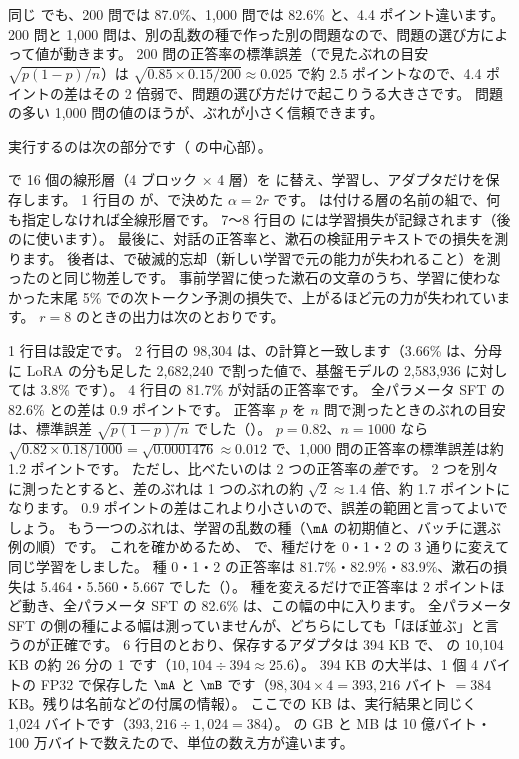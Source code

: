 同じ  でも、200 問では 87.0\%、1,000 問では 82.6\% と、4.4 ポイント違います。
200 問と 1,000 問は、別の乱数の種で作った別の問題なので、問題の選び方によって値が動きます。
200 問の正答率の標準誤差（で見たぶれの目安 $\sqrt{p(1-p)/n}$）は $\sqrt{0.85\times0.15/200}\approx0.025$ で約 2.5 ポイントなので、4.4 ポイントの差はその 2 倍弱で、問題の選び方だけで起こりうる大きさです。
問題の多い 1,000 問の値のほうが、ぶれが小さく信頼できます。

実行するのは次の部分です（ の中心部）。


 で 16 個の線形層（4 ブロック × 4 層）を  に替え、学習し、アダプタだけを保存します。
1 行目の  が、で決めた $\alpha=2r$ です。
 は付ける層の名前の組で、何も指定しなければ全線形層です。
7〜8 行目の  には学習損失が記録されます（後のに使います）。
最後に、対話の正答率と、漱石の検証用テキストでの損失を測ります。
後者は、で破滅的忘却（新しい学習で元の能力が失われること）を測ったのと同じ物差しです。
事前学習に使った漱石の文章のうち、学習に使わなかった末尾 5\% での次トークン予測の損失で、上がるほど元の力が失われています。
$r=8$ のときの出力は次のとおりです。


1 行目は設定です。
2 行目の 98,304 は、の計算と一致します（3.66\% は、分母に LoRA の分も足した 2,682,240 で割った値で、基盤モデルの 2,583,936 に対しては 3.8\% です）。
4 行目の 81.7\% が対話の正答率です。
全パラメータ SFT の 82.6\% との差は 0.9 ポイントです。
正答率 $p$ を $n$ 問で測ったときのぶれの目安は、標準誤差 $\sqrt{p(1-p)/n}$ でした（）。
$p=0.82$、$n=1000$ なら $\sqrt{0.82\times0.18/1000}=\sqrt{0.0001476}\approx0.012$ で、1,000 問の正答率の標準誤差は約 1.2 ポイントです。
ただし、比べたいのは 2 つの正答率の\emph{差}です。
2 つを別々に測ったとすると、差のぶれは 1 つのぶれの約 $\sqrt{2}\approx1.4$ 倍、約 1.7 ポイントになります。
0.9 ポイントの差はこれより小さいので、誤差の範囲と言ってよいでしょう。
もう一つのぶれは、学習の乱数の種（$\mA$ の初期値と、バッチに選ぶ例の順）です。
これを確かめるため、 で、種だけを 0・1・2 の 3 通りに変えて同じ学習をしました。
種 0・1・2 の正答率は 81.7\%・82.9\%・83.9\%、漱石の損失は 5.464・5.560・5.667 でした（）。
種を変えるだけで正答率は 2 ポイントほど動き、全パラメータ SFT の 82.6\% は、この幅の中に入ります。
全パラメータ SFT の側の種による幅は測っていませんが、どちらにしても「ほぼ並ぶ」と言うのが正確です。
6 行目のとおり、保存するアダプタは 394 KB で、 の 10,104 KB の約 26 分の 1 です（$10{,}104\div394\approx25.6$）。
394 KB の大半は、1 個 4 バイトの FP32 で保存した $\mA$ と $\mB$ です（$98{,}304\times4=393{,}216$ バイト $=384$ KB。残りは名前などの付属の情報）。
ここでの KB は、実行結果と同じく 1,024 バイトです（$393{,}216\div1{,}024=384$）。
の GB と MB は 10 億バイト・100 万バイトで数えたので、単位の数え方が違います。

